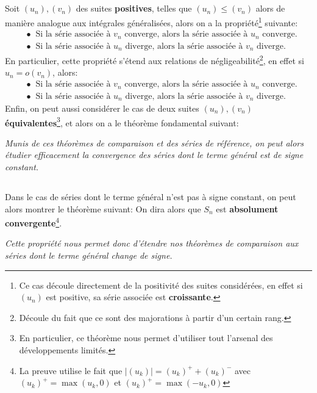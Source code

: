 \subsection*{}
Soit \((u_n),(v_n)\) des suites \textbf{positives}, telles que \((u_n) \leq (v_n)\) alors de manière analogue aux intégrales généralisées, alors on a la propriété\footnote[1]{Ce cas découle directement de la positivité des suites considérées, en effet si \((u_n)\) est positive, sa série associée est \textbf{croissante}.} suivante:
\begin{align*}
   &\bullet \;\; \text{Si la série associée à \(v_n\) converge, alors la série associée à \(u_n\) converge.} \\
   &\bullet \;\; \text{Si la série associée à \(u_n\) diverge, alors la série associée à \(v_n\) diverge.}
\end{align*}
En particulier, cette propriété s'étend aux relations de négligeabilité\footnote[2]{Découle du fait que ce sont des majorations à partir d'un certain rang.}, en effet si \(u_n = o(v_n)\), alors:
\begin{align*}
   &\bullet \;\; \text{Si la série associée à \(v_n\) converge, alors la série associée à \(u_n\) converge.} \\
   &\bullet \;\; \text{Si la série associée à \(u_n\) diverge, alors la série associée à \(v_n\) diverge.}
\end{align*}
Enfin, on peut aussi considérer le cas de deux suites \((u_n), (v_n)\) \textbf{équivalentes}\footnote[3]{En particulier, ce théorème nous permet d'utiliser tout l'arsenal des développements limités.}, et alors on a le théorème fondamental suivant:
\begin{center}
   \textit{Munis de ces théorèmes de comparaison et des séries de référence, on peut alors étudier efficacement la convergence des séries dont le terme général est de signe constant.}
\end{center}

\subsection*{}
Dans le cas de séries dont le terme général n'est pas à signe constant, on peut alors montrer le théorème suivant:
On dira alors que \(S_n\) est \textbf{absolument convergente}\footnote[4]{La preuve utilise le fait que \(|(u_k)| = (u_k)^+ + (u_k)^-\) avec \((u_k)^+ = \max(u_k, 0)\) et \((u_k)^+ = \max(-u_k, 0)\)}.
\begin{center}
   \textit{Cette propriété nous permet donc d'étendre nos théorèmes de comparaison aux séries dont le terme général change de signe.}
\end{center}

